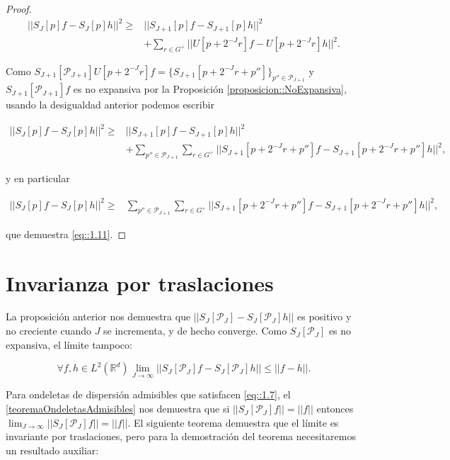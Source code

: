 \begin{proof}
\begin{align*}
    ||S_{J}[p]f-S_J[p]h||^2 \geq & || S_{J+1}[p]f-S_{J+1}[p]h||^2 \\
    & + \sum_{r\in G^+} ||U[p+2^{-J}r]f-U[p+2^{-J}r]h||^2.
\end{align*}


\noindent Como $S_{J+1}[\mathcal{P}_{J+1}]U[p+2^{-J}r]f=\lbrace S_{J+1} [p+2^{-J}r+p'']\rbrace_{p''\in\mathcal{P}_{J+1}}$  y $S_{J+1}[\mathcal{P}_{J+1}]f$ es no expansiva por la Proposición \ref{proposicion::NoExpansiva}, usando la desigualdad anterior podemos escribir

\begin{align*}
    ||S_{J}[p]f - S_J[p]h||^2 \geq & ||S_{J+1}[p]f-S_{J+1}[p]h||^2 \\
    & + \sum_{p''\in \mathcal{P}_{J+1}} \sum_{r\in G^+} || S_{J+1}[p+2^{-J}r+p'']f- S_{J+1}[p+2^{-J}r+p'']h||^2,
\end{align*}

\noindent y en particular

\begin{align*}
  ||S_{J}[p]f - S_J[p]h||^2 \geq & \sum_{p''\in \mathcal{P}_{J+1}} \sum_{r\in G^+} || S_{J+1}[p+2^{-J}r+p'']f- S_{J+1}[p+2^{-J}r+p'']h||^2,
\end{align*}

\noindent que demuestra \eqref{eq::1.11}. \qedhere
\end{proof}


\section{Invarianza por traslaciones}

\noindent La proposición anterior nos demuestra que $||S_J[\mathcal{P}_J]-S_J[\mathcal{P}_J]h||$ es positivo y no creciente cuando $J$ se incrementa, y de hecho converge. Como $S_J[\mathcal{P}_J]$ es no expansiva, el límite tampoco: 

$$\forall f,h \in L^2(\mathbb{R}^d) \lim_{J\rightarrow\infty} ||S_J[\mathcal{P}_J]f-S_{J}[\mathcal{P}_J]h|| \leq ||f-h||.$$

\medskip

\noindent Para ondeletas de dispersión admisibles que satisfacen \eqref{eq::1.7}, el \autoref{teoremaOndeletasAdmisibles} nos demuestra que si $||S_J[\mathcal{P}_J]f||=||f||$ entonces $\lim_{J\rightarrow\infty}||S_J[\mathcal{P}_J]f||=||f||$. El siguiente teorema demuestra que el límite es invariante por traslaciones, pero para la demostración del teorema necesitaremos un resultado auxiliar: 

